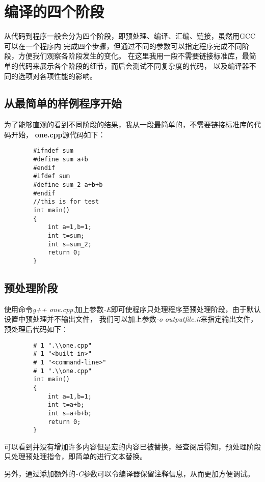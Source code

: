 \documentclass[UTF8]{ctexart}
\begin{document}
    \section{编译的四个阶段}\label{basic}
    从代码到程序一般会分为四个阶段，即预处理、编译、汇编、链接，虽然用GCC可以在一个程序内
    完成四个步骤，但通过不同的参数可以指定程序完成不同阶段，方便我们观察各阶段发生的变化。
    在这里我用一段不需要链接标准库，最简单的代码来展示各个阶段的细节，而后会测试不同复杂度的代码，
    以及编译器不同的选项对各项性能的影响。
    \subsection{从最简单的样例程序开始}
    为了能够直观的看到不同阶段的结果，我从一段最简单的，不需要链接标准库的代码开始，
    {\textbf{one.cpp}}源代码如下：
    \begin{verbatim}
        #ifndef sum
        #define sum a+b
        #endif
        #ifdef sum
        #define sum_2 a+b+b
        #endif
        //this is for test
        int main()
        {
            int a=1,b=1;
            int t=sum;
            int s=sum_2;
            return 0;
        }
    \end{verbatim}
    \subsection{预处理阶段}
    使用命令\emph{g++ one.cpp},加上参数\emph{-E}即可使程序只处理程序至预处理阶段，由于默认设置中预处理并不输出文件，
    我们可以加上参数\emph{-o outputfile.ii}来指定输出文件，预处理后代码如下：
    \begin{verbatim}
        # 1 ".\\one.cpp"
        # 1 "<built-in>"
        # 1 "<command-line>"
        # 1 ".\\one.cpp"
        int main()
        {
            int a=1,b=1;
            int t=a+b;
            int s=a+b+b;
            return 0;
        }                 
    \end{verbatim}
    可以看到并没有增加许多内容但是宏的内容已被替换，经查阅后得知，预处理阶段只处理预处理指令，即简单的进行文本替换。\cite{GCCUse}

    另外，通过添加额外的\emph{-C}参数可以令编译器保留注释信息，从而更加方便调试。
\end{document}

